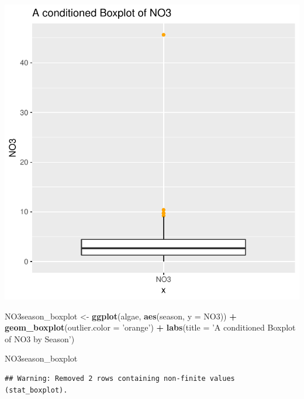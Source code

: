 \documentclass[]{article}
\newenvironment{Shaded}{\begin{snugshade}}{\end{snugshade}}
\newcommand{\KeywordTok}[1]{\textcolor[rgb]{0.13,0.29,0.53}{\textbf{#1}}}
\newcommand{\DataTypeTok}[1]{\textcolor[rgb]{0.13,0.29,0.53}{#1}}
\newcommand{\StringTok}[1]{\textcolor[rgb]{0.31,0.60,0.02}{#1}}
\newcommand{\OperatorTok}[1]{\textcolor[rgb]{0.81,0.36,0.00}{\textbf{#1}}}
\newcommand{\NormalTok}[1]{#1}
\begin{document}
\begin{center}\includegraphics{homework1-handout_files/figure-latex/unnamed-chunk-2-1} \end{center}

\begin{Shaded}
\begin{Highlighting}[]
\NormalTok{NO3season_boxplot <-}\StringTok{ }\KeywordTok{ggplot}\NormalTok{(algae, }\KeywordTok{aes}\NormalTok{(season, }\DataTypeTok{y =}\NormalTok{ NO3)) }\OperatorTok{+}
\StringTok{  }\KeywordTok{geom_boxplot}\NormalTok{(}\DataTypeTok{outlier.color =} \StringTok{'orange'}\NormalTok{) }\OperatorTok{+}
\StringTok{  }\KeywordTok{labs}\NormalTok{(}\DataTypeTok{title =} \StringTok{'A conditioned Boxplot of NO3 by Season'}\NormalTok{)}

\NormalTok{NO3season_boxplot}
\end{Highlighting}
\end{Shaded}

\begin{verbatim}
## Warning: Removed 2 rows containing non-finite values (stat_boxplot).
\end{verbatim}
\end{document}
